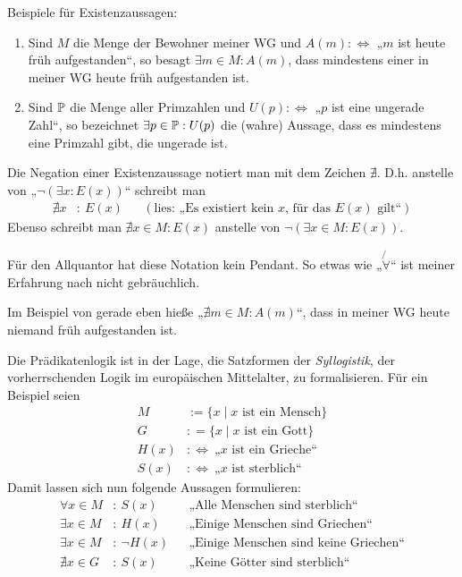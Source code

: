 \begin{bsp}
    Beispiele für Existenzaussagen:
    \begin{enumerate}
        \item Sind $M$ die Menge der Bewohner meiner WG und $A(m):\Leftrightarrow$ „$m$ ist heute früh aufgestanden“, so besagt $\exists m\in M: A(m)$, dass mindestens einer in meiner WG heute früh aufgestanden ist.
        \item Sind $\mathbb P$ die Menge aller Primzahlen und $U(p):\Leftrightarrow$ „$p$ ist eine ungerade Zahl“, so bezeichnet $\exists p\in \mathbb P: U(p)$ die (wahre) Aussage, dass es mindestens eine Primzahl gibt, die ungerade ist.
    \end{enumerate}
\end{bsp}


\begin{nota}
    Die Negation einer Existenzaussage notiert man mit dem Zeichen $\nexists$. D.h. anstelle von „$\neg (\exists x: E(x))$“ schreibt man
    \begin{align*}
        \nexists x &:\ E(x) && (\text{lies: „Es existiert kein $x$, für das $E(x)$ gilt“})
    \end{align*}
    Ebenso schreibt man $\nexists x\in M: E(x)$ anstelle von $\neg (\exists x\in M: E(x))$.
    
    Für den Allquantor hat diese Notation kein Pendant. So etwas wie „$\not{\!\forall}$“ ist meiner Erfahrung nach nicht gebräuchlich.
\end{nota}


\begin{bsp}
    Im Beispiel von gerade eben hieße „$\nexists m\in M: A(m)$“, dass in meiner WG heute niemand früh aufgestanden ist.
\end{bsp}


\begin{bsp}[Syllogistik]
    Die Prädikatenlogik ist in der Lage, die Satzformen der \emph{Syllogistik}, der vorherrschenden Logik im europäischen Mittelalter, zu formalisieren. Für ein Beispiel seien
    \begin{align*}
        M & := \{ x\mid  \text{$x$ ist ein Mensch} \} \\
        G &  : = \{x\mid \text{$x$ ist ein Gott} \} \\
        H(x) & :\Leftrightarrow\ \text{„$x$ ist ein Grieche“} \\
        S(x) & :\Leftrightarrow\ \text{„$x$ ist sterblich“}
    \end{align*}
    Damit lassen sich nun folgende Aussagen formulieren:
    \begin{align*}
        \forall x\in M& :\ S(x) && \text{„Alle Menschen sind sterblich“} \\
        \exists x \in M & :\ H(x)&& \text{„Einige Menschen sind Griechen“} \\
        \exists x \in M& :\ \neg H(x) && \text{„Einige Menschen sind keine Griechen“} \\
        \nexists x\in G & :\ S(x)&& \text{„Keine Götter sind sterblich“}
    \end{align*}
\end{bsp}


